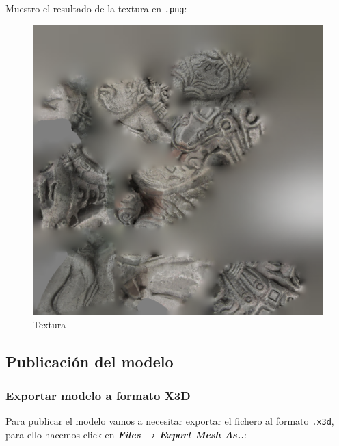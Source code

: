 \documentclass[options]{article}
\begin{document}
Muestro el resultado de la textura en \texttt{.png}:

\begin{figure}[H]
    \centering
    \includegraphics[scale=0.45]{images/PoissonMeshMayanSculpture_topo_sin_fisuras_tex.png}
    \caption{Textura}
\end{figure}

\pagebreak

\subsection{Publicación del modelo}

\subsubsection{Exportar modelo a formato X3D}

Para publicar el modelo vamos a necesitar exportar el fichero al formato \texttt{.x3d}, para ello hacemos click en \textbf{\textit{Files → Export Mesh As..}}:
\end{document}
